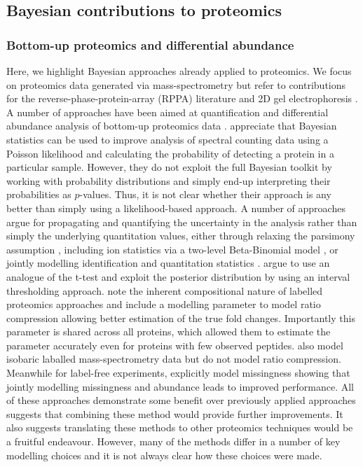 \documentclass[12pt,english, journal=jpr, layout=twocolumn]{article}
\begin{document}
\subsection{Bayesian contributions to proteomics}
\subsubsection{Bottom-up proteomics and differential abundance}
Here, we highlight Bayesian approaches already applied to proteomics. We focus on proteomics data generated via mass-spectrometry but refer to contributions for the reverse-phase-protein-array (RPPA) literature \citep{Crook::2019, Ni::2019, Maity::2020} and 2D gel electrophoresis \citep{Morris::2011}. A number of approaches have been aimed at quantification and differential abundance analysis of bottom-up proteomics data \citep{Phillips::2021, The::2021, The::2019, Santra::2016, Peshkin::2019, Millikin::2020, Serang::2013, OBrien::2018, Serang::2012, Carvalho::2011}. \citet{Carvalho::2011} appreciate that Bayesian statistics can be used to improve analysis of spectral counting data using a Poisson likelihood and calculating the probability of detecting a protein in a particular sample. However, they do not exploit the full Bayesian toolkit by working with probability distributions and simply end-up interpreting their probabilities as $p$-values. Thus, it is not clear whether their approach is any better than simply using a likelihood-based approach. A number of approaches \citep{The::2021, The::2019, Peshkin::2019, Serang::2012} argue for propagating and quantifying the uncertainty in the analysis rather than simply the underlying quantitation values, either through relaxing the parsimony assumption \citep{Serang::2012}, including ion statistics via a two-level Beta-Binomial model \citep{Peshkin::2019}, or jointly modelling identification and quantitation statistics \citep{The::2019, The::2021}. \citet{Millikin::2020} argue to use an analogue of the t-test and exploit the posterior distribution by using an interval thresholding approach. \citet{OBrien::2018} note the inherent compositional nature of labelled proteomics approaches and include a modelling parameter to model ratio compression allowing better estimation of the true fold changes. Importantly this parameter is shared across all proteins, which allowed them to estimate the parameter accurately even for proteins with few observed peptides. \citet{Jow::2014} also model isobaric laballed mass-spectrometry data but do not model ratio compression. Meanwhile for label-free experiments, \citet{OBrien::2018b} explicitly model missingness showing that jointly modelling missingness and abundance leads to improved performance. All of these approaches demonstrate some benefit over previously applied approaches suggests that combining these method would provide further improvements. It also suggests translating these methods to other proteomics techniques would be a fruitful endeavour. However, many of the methods differ in a number of key modelling choices and it is not always clear how these choices were made.
\end{document}
